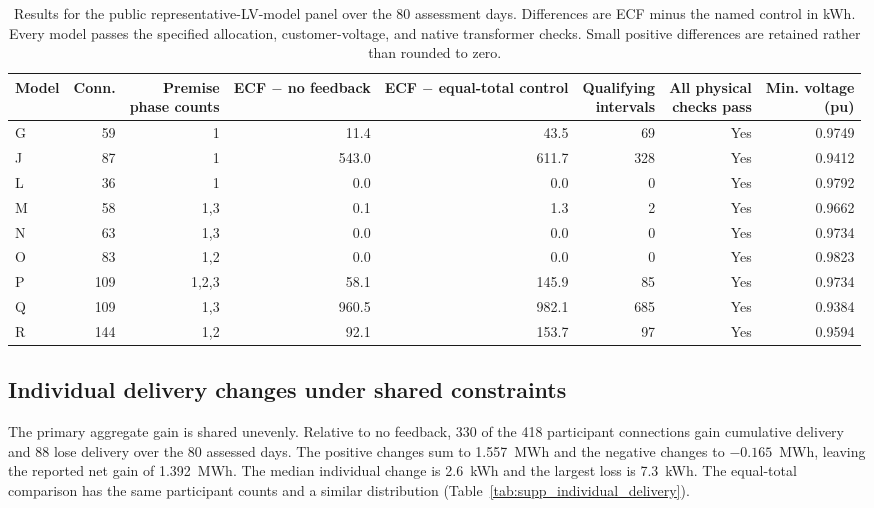 \documentclass[11pt]{article}
\begin{document}
\begin{table}[!ht]
\centering
\caption{Results for the public representative-LV-model panel over the 80
assessment days. Differences are ECF minus the named control in kWh.
Every model passes the specified allocation, customer-voltage, and native
transformer checks. Small positive differences are retained rather than
rounded to zero.}
\label{tab:supp_au_taxonomy}
\scriptsize
\setlength{\tabcolsep}{2.7pt}
\begin{tabular}{@{}lrrrrrrr@{}}
\toprule
Model & Conn. & \shortstack{Premise\\phase counts} & \shortstack{ECF $-$ no\\feedback} & \shortstack{ECF $-$ equal-total\\control} & \shortstack{Qualifying\\intervals} & \shortstack{All physical\\checks pass} & \shortstack{Min. voltage\\(pu)} \\
\midrule
G & 59 & 1 & 11.4 & 43.5 & 69 & Yes & 0.9749 \\
J & 87 & 1 & 543.0 & 611.7 & 328 & Yes & 0.9412 \\
L & 36 & 1 & 0.0 & 0.0 & 0 & Yes & 0.9792 \\
M & 58 & 1,3 & 0.1 & 1.3 & 2 & Yes & 0.9662 \\
N & 63 & 1,3 & 0.0 & 0.0 & 0 & Yes & 0.9734 \\
O & 83 & 1,2 & 0.0 & 0.0 & 0 & Yes & 0.9823 \\
P & 109 & 1,2,3 & 58.1 & 145.9 & 85 & Yes & 0.9734 \\
Q & 109 & 1,3 & 960.5 & 982.1 & 685 & Yes & 0.9384 \\
R & 144 & 1,2 & 92.1 & 153.7 & 97 & Yes & 0.9594 \\
\bottomrule
\end{tabular}
\end{table}

\subsection{Individual delivery changes under shared constraints}
\label{supp:individual_delivery}

The primary aggregate gain is shared unevenly. Relative to no feedback,
330 of the 418 participant connections gain cumulative delivery and 88 lose
delivery over the 80 assessed days. The positive changes sum to 1.557~MWh
and the negative changes to $-0.165$~MWh, leaving the reported net gain of
1.392~MWh. The median individual change is 2.6~kWh and the largest loss
is 7.3~kWh. The equal-total comparison has the same participant counts
and a similar distribution (Table~\ref{tab:supp_individual_delivery}).
\end{document}
